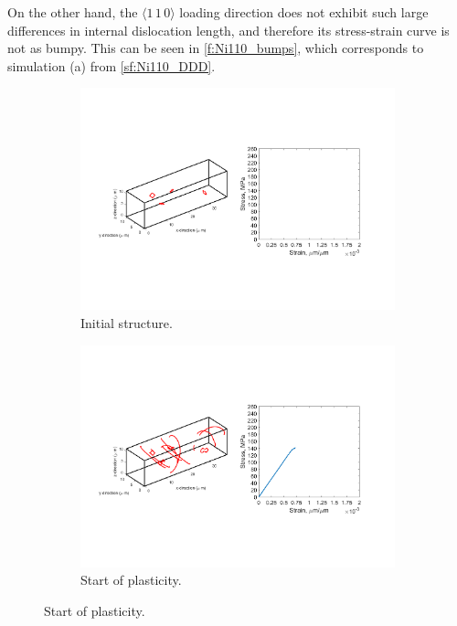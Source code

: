 On the other hand, the $\langle 1\, 1\, 0 \rangle$ loading direction does not exhibit such large differences in internal dislocation length, and therefore its stress-strain curve is not as bumpy. This can be seen in \cref{f:Ni110_bumps}, which corresponds to simulation (a) from \cref{sf:Ni110_DDD}.
\begin{figure}
    \centering
    \begin{subfigure}[t]{\linewidth}
        \centering
        \includegraphics[trim={1.75cm 5cm 2.5cm 5.5cm},clip,width=\linewidth]{../data/16-Mar-2021_4_tensile_ni_110_0.pdf}
        \caption{Initial structure.}
    \end{subfigure}

    \begin{subfigure}[t]{\linewidth}
        \centering
        \includegraphics[trim={1.75cm 5cm 2.5cm 5.5cm},clip,width=\linewidth]{../data/16-Mar-2021_4_tensile_ni_110_5400.pdf}
        \caption{Start of plasticity.}
    \end{subfigure}


\end{figure}
